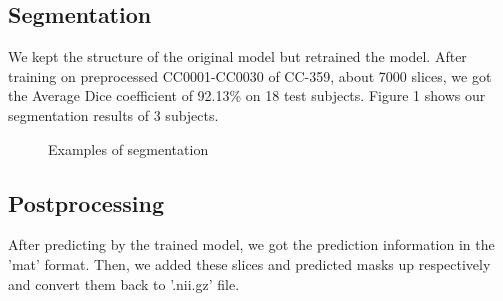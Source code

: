 \documentclass[12pt]{article}
\begin{document}
\subsection{Segmentation}
We kept the structure of the original model but retrained the model. After training on preprocessed CC0001-CC0030 of CC-359, about 7000 slices, we got the Average Dice coefficient of 92.13\% on 18 test subjects. Figure 1 shows our segmentation results of 3 subjects.
\begin{figure}[H]
\centering 
{}
\caption{Examples of segmentation}
\end{figure}
\subsection{Postprocessing}
After predicting by the trained model, we got the prediction information in the 'mat' format. Then, we added these slices and predicted masks up respectively and convert them back to '.nii.gz' file.
\end{document}
